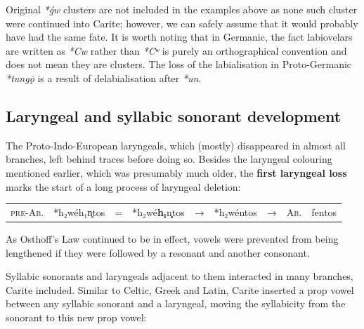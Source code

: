 \documentclass[svgnames,x11names,b5paper]{book}
\begin{document}
Original \textit{*ǵw} clusters are not included in the examples above as none such cluster were continued into Carite; however, we can safely assume that it would probably have had the same fate. It is worth noting that in Germanic, the fact labiovelars are written as \textit{*Cw} rather than \textit{*Cʷ} is purely an orthographical convention and does not mean they are clusters. The loss of the labialisation in Proto-Germanic \textit{*tungǭ} is a result of delabialisation after \textit{*un}.

            \subsection{Laryngeal and syllabic sonorant development}
        
        The Proto-Indo-European laryngeals, which (mostly) disappeared in almost all branches, left behind traces before doing so. Besides the laryngeal colouring mentioned earlier, which was presumably much older, the \textbf{first laryngeal loss} marks the start of a long process of laryngeal deletion:

            \begin{table}[H]
                \begin{center}
                \begin{tabular}{llcllllll}
                \textsc{pre-Ab.} & *h₂wéh₁n̥tos & = & *h₂wé\textbf{h₁}n\textbf{̥}tos & → & *h₂wéntos & → & \textsc{Ab.} & fentos\\
                \end{tabular}
                \end{center}
                \end{table}
        
            As Osthoff's Law continued to be in effect, vowels were prevented from being lengthened if they were followed by a resonant and another consonant.

        Syllabic sonorants and laryngeals adjacent to them interacted in many branches, Carite included. Similar to Celtic, Greek and Latin, Carite inserted a prop vowel between any syllabic sonorant and a laryngeal, moving the syllabicity from the sonorant to this new prop vowel:
\end{document}
